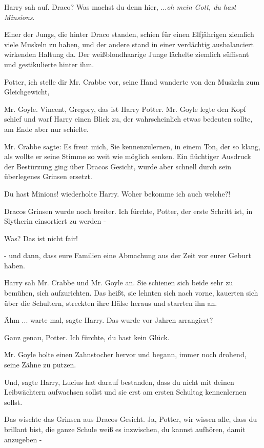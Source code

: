 Harry sah auf. \glqq Draco? Was machst du denn hier, ...\emph{oh mein Gott, du
hast Minsions}.\grqq{}

Einer der Jungs, die hinter Draco standen, schien für einen Elfjährigen ziemlich
viele Muskeln zu haben, und der andere stand in einer verdächtig ausbalanciert
wirkenden Haltung da. Der weißblondhaarige Junge lächelte ziemlich süffisant und
gestikulierte hinter ihm.

\glqq Potter, ich stelle dir Mr. Crabbe vor\grqq{}, seine Hand wanderte von den
Muskeln zum Gleichgewicht,

\glqq Mr. Goyle. Vincent, Gregory, das ist Harry Potter.\grqq{} Mr. Goyle legte
den Kopf schief und warf Harry einen Blick zu, der wahrscheinlich etwas bedeuten
sollte, am Ende aber nur schielte.

Mr. Crabbe sagte: \glqq Es freut mich, Sie kennenzulernen\grqq{}, in einem Ton,
der so klang, als wollte er seine Stimme so weit wie möglich senken. Ein
flüchtiger Ausdruck der Bestürzung ging über Dracos Gesicht, wurde aber schnell
durch sein überlegenes Grinsen ersetzt.

\glqq Du hast Minions!\grqq{} wiederholte Harry. \glqq Woher bekomme ich auch
welche?!\grqq{}

Dracos Grinsen wurde noch breiter. \glqq Ich fürchte, Potter, der erste Schritt
ist, in Slytherin einsortiert zu werden -\grqq{}

\glqq Was? Das ist nicht fair!\grqq{}

\glqq - und dann, dass eure Familien eine Abmachung aus der Zeit vor eurer
Geburt haben.\grqq{}

Harry sah Mr. Crabbe und Mr. Goyle an. Sie schienen sich beide sehr zu bemühen,
sich aufzurichten. Das heißt, sie lehnten sich nach vorne, kauerten sich über
die Schultern, streckten ihre Hälse heraus und starrten ihn an.

\glqq Ähm ... warte mal\grqq{}, sagte Harry. \glqq Das wurde vor Jahren
arrangiert?\grqq{}

\glqq Ganz genau, Potter. Ich fürchte, du hast kein Glück.\grqq{}

Mr. Goyle holte einen Zahnstocher hervor und begann, immer noch drohend, seine
Zähne zu putzen.

\glqq Und\grqq{}, sagte Harry, \glqq Lucius hat darauf bestanden, dass du nicht
mit deinen Leibwächtern aufwachsen sollst und sie erst am ersten Schultag
kennenlernen sollst.\grqq{}

Das wischte das Grinsen aus Dracos Gesicht. \glqq Ja, Potter, wir wissen alle,
dass du brillant bist, die ganze Schule weiß es inzwischen, du kannst aufhören,
damit anzugeben -\grqq{}

